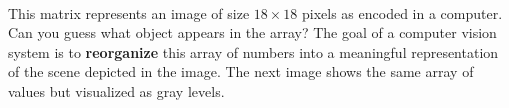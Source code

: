 \[\begin{array}{cc}
\end{array}
\]

This matrix represents an image of size $18 \times 18$ pixels as encoded in a computer. Can you guess what object appears in the array?
The goal of a computer vision system is to {\bf reorganize} this array of numbers into a meaningful representation of the scene depicted in the image. The next image shows the same array of values but visualized as gray levels.






